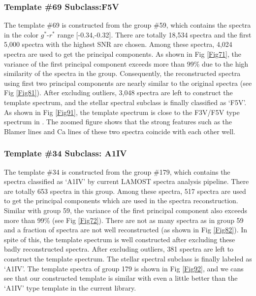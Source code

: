 \documentclass[manuscript]{aastex}
\begin{document}
\subsubsection{Template \#69 Subclass:F5V}
\label{sec:conexamples}
The template \#69 is constructed from the group \#59,
which contains the spectra in the color $g^*$-$r^*$ range [-0.34,-0.32].
There are totally 18,534 spectra and the first 5,000 spectra with the highest SNR are chosen.
Among these spectra, 4,024 spectra are used to get the principal components.
As shown in Fig \ref{Fig71},  the variance of the first  principal component  exceeds more than 99\% due to the high similarity of the spectra in the group.
Consequently, the reconstructed spectra using first two  principal components are nearly similar to the original spectra (see Fig \ref{Fig81}).
After excluding outliers, 3,048 spectra are left to construct the template spectrum,
and the stellar spectral subclass is finally classified as `F5V'.
As shown in Fig \ref{Fig91}, the template spectrum is close to the F3V/F5V type spectrum in \cite{bolton2012spectral}.
The zoomed figure shows that the strong features such as  the Blamer lines and  Ca lines of these two spectra coincide
 with each other well.



\subsubsection{Template \#34 Subclass: A1IV}
The template \#34 is constructed from the group \#179,
which contains the spectra classified as `A1IV' by current LAMOST spectra analysis pipeline.
There are totally 653 spectra in this group.
Among these spectra, 517 spectra are used to get the principal components which are used in the spectra reconstruction.
Similar with group 59, the variance of the first  principal component also exceeds more than 99\%  (see Fig \ref{Fig72}).
There are not as many spectra as in group 59 and a fraction of  spectra are not well reconstructed (as shown in Fig \ref{Fig82}).
In spite of this, the template spectrum is well constructed after excluding these badly reconstructed spectra.
After excluding outliers, 381 spectra are left to construct the template spectrum.
The stellar spectral subclass is finally labeled as `A1IV'.
The template spectra of group 179 is  shown in Fig \ref{Fig92},
and we cans see that our constructed template is similar with even  a little better than the `A1IV' type template in  the current library.
\end{document}

